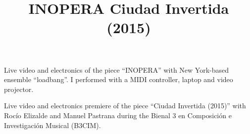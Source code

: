 
 

 

 \title{ INOPERA }
 \begin{position}
{ Live video and electronics of the piece ``INOPERA'' with New York-based ensemble ``loadbang''. I performed with a MIDI controller, laptop and video projector. }
\end{position}

 \title{ Ciudad Invertida (2015) }
 \begin{position}
{ Live video and electronics premiere of the piece ``Ciudad Invertida (2015)'' with Rocío Elizalde and Manuel Pastrana during the Bienal 3 en Composición e Investigación Musical (B3CIM).}
\end{position}
 

 
